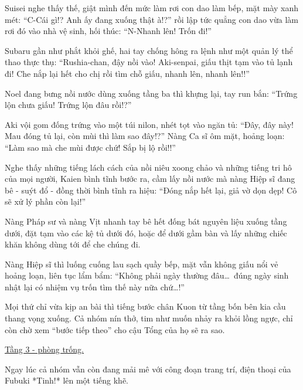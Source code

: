 \documentclass[../main.tex]{subfiles}
\begin{document}
Suisei nghe thấy thế, giật mình đến mức làm rơi con dao làm bếp, mặt mày xanh mét: ``C-Cái gì!? Anh ấy đang xuống thật à!?'' rồi lập tức quẳng con dao vừa làm rơi đó vào nhà vệ sinh, hối thúc: ``N-Nhanh lên! Trốn đi!''

Subaru gần như phắt khỏi ghế, hai tay chống hông ra lệnh như một quản lý thể thao thực thụ: ``Rushia-chan, đậy nồi vào! Aki-senpai, giấu thịt tạm vào tủ lạnh đi! Che nắp lại hết cho chị rồi tìm chỗ giấu, nhanh lên, nhanh lên!!''

Noel đang bưng nồi nước dùng xuống tầng ba thì khựng lại, tay run bắn: ``Trứng lộn chưa giấu! Trứng lộn đâu rồi!?''

Aki vội gom đống trứng vào một túi nilon, nhét tọt vào ngăn tủ: ``Đây, đây này! Mau đóng tủ lại, còn mùi thì làm sao đây!?'' Nàng Ca sĩ ôm mặt, hoảng loạn: ``Làm sao mà che mùi được chứ! Sắp bị lộ rồi!!''

Nghe thấy những tiếng lách cách của nồi niêu xoong chảo và những tiếng tri hô của mọi người, Kaien bình tĩnh bước ra, cầm lấy nồi nước mà nàng Hiệp sĩ đang bê - suýt đổ - đồng thời bình tĩnh ra hiệu: ``Đóng nắp hết lại, giả vờ dọn dẹp! Cô sẽ xử lý phần còn lại!''

Nàng Pháp sư và nàng Vịt nhanh tay bê hết đống bát nguyên liệu xuống tầng dưới, đặt tạm vào các kệ tủ dưới đó, hoặc để dưới gầm bàn và lấy những chiếc khăn không dùng tới để che chúng đi.

Nàng Hiệp sĩ thì luống cuống lau sạch quầy bếp, mặt vẫn không giấu nổi vẻ hoảng loạn, liên tục lẩm bẩm: ``Không phải ngày thường đâu\dots\ đúng ngày sinh nhật lại có nhiệm vụ trốn tìm thế này nữa chứ\dots!''

Mọi thứ chỉ vừa kịp an bài thì tiếng bước chân Kuon từ tầng bốn bên kia cầu thang vọng xuống. Cả nhóm nín thở, tim như muốn nhảy ra khỏi lồng ngực, chỉ còn chờ xem ``bước tiếp theo'' cho cậu Tổng của họ sẽ ra sao.


\begin{center}
    \uline{Tầng 3 - phòng trống.}
\end{center}

Ngay lúc cả nhóm vẫn còn đang mải mê với công đoạn trang trí, điện thoại của Fubuki *Tinh!* lên một tiếng khẽ.
\end{document}
